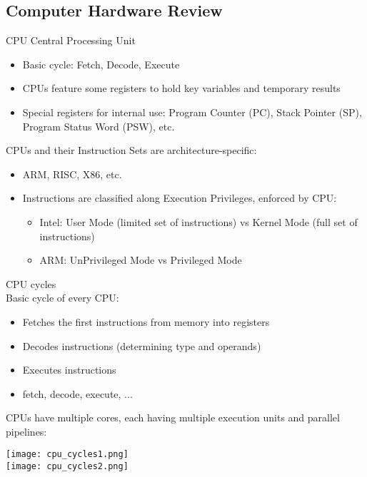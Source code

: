 \raggedcolumns

\subsection{Computer Hardware Review}

\begin{definition}{CPU} Central Processing Unit\\
    \begin{itemize}
        \item Basic cycle: Fetch, Decode, Execute
        \item CPUs feature some registers to hold key variables and temporary results
        \item Special registers for internal use: Program Counter (PC), Stack Pointer (SP), Program Status Word (PSW), etc.
    \end{itemize}
    \vspace{2mm}
    CPUs and their Instruction Sets are architecture-specific:
    \begin{itemize}
        \item ARM, RISC, X86, etc.
        \item Instructions are classified along Execution Privileges, enforced by CPU:
        \begin{itemize}
            \item Intel: User Mode (limited set of instructions) vs Kernel Mode (full set of instructions)
            \item ARM: UnPrivileged Mode vs Privileged Mode
        \end{itemize}
    \end{itemize}
\end{definition}

\begin{concept}{CPU cycles}\\
    Basic cycle of every CPU:    
    \begin{itemize}
        \item Fetches the first instructions from memory into registers
        \item Decodes instructions (determining type and operands)
        \item Executes instructions
        \item fetch, decode, execute, ...
    \end{itemize}
CPUs have multiple cores, each having multiple execution units and parallel pipelines:

\texttt{[image: cpu\_cycles1.png]}\\
\texttt{[image: cpu\_cycles2.png]}
\end{concept}

